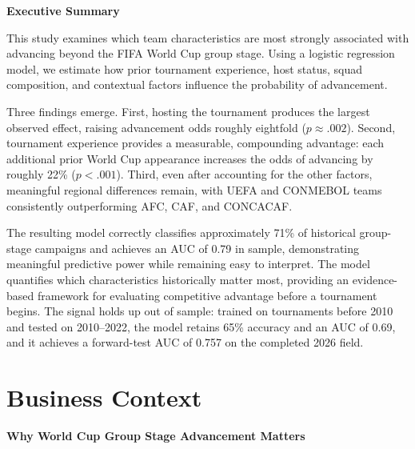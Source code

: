 \documentclass{article}
\begin{document}
\begin{tcolorbox}[
    colback=gray!8,
    colframe=gray!8,
    sharp corners,
    boxrule=0pt
]
\textbf{\large Executive Summary}

\vspace{1.0em}

This study examines which team characteristics are most strongly associated with advancing beyond the FIFA World Cup group stage. Using  a logistic regression model, we estimate how prior tournament experience, host status, squad composition, and contextual factors influence the probability of advancement.
\vspace{0.8em}

Three findings emerge. First, hosting the tournament produces the largest observed effect, raising advancement odds roughly eightfold ($p \approx .002$). Second, tournament experience provides a measurable, compounding advantage: each additional prior World Cup appearance increases the odds of advancing by roughly 22\% ($p < .001$). Third, even after accounting for the other factors, meaningful regional differences remain, with UEFA and CONMEBOL teams consistently outperforming AFC, CAF, and CONCACAF.
\vspace{0.8em}

The resulting model correctly classifies approximately 71\% of historical group-stage campaigns and achieves an AUC of 0.79 in sample, demonstrating meaningful predictive power while remaining easy to interpret. The model quantifies which characteristics historically matter most, providing an evidence-based framework for evaluating competitive advantage before a tournament begins. The signal holds up out of sample: trained on tournaments before 2010 and tested on 2010--2022, the model retains 65\% accuracy and an AUC of 0.69, and it achieves a forward-test AUC of 0.757 on the completed 2026 field. 

\end{tcolorbox}




\vspace{2.8em}

\section{Business Context}

\vspace{1.2em}

\textbf{\large Why World Cup Group Stage Advancement Matters} 
\end{document}
